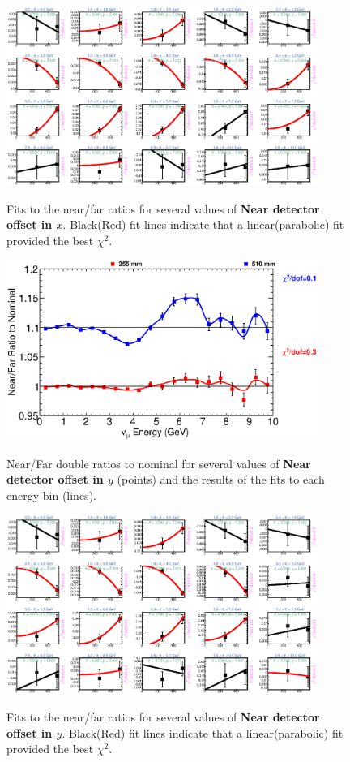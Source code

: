 \begin{figure}[hb]
  \begin{center}
    {\includegraphics[width=4.0in]{figures/LBNENDX_nof_fits.eps}}
  \end{center}
\caption{ Fits to the near/far ratios for several values of {\bf Near detector offset in $x$}. Black(Red) fit lines indicate that a linear(parabolic) fit provided the best $\chi^2$. }
\end{figure}

\begin{figure}[ht]
  \begin{center}
    {\includegraphics[width=4.0in]{figures/LBNENDY_nof_summary.eps}}
  \end{center}
\caption{ Near/Far double ratios to nominal for several values of {\bf Near detector offset in $y$} (points) and the results of the fits to each energy bin (lines).}
\end{figure}

\begin{figure}[hb]
  \begin{center}
    {\includegraphics[width=4.0in]{figures/LBNENDY_nof_fits.eps}}
  \end{center}
\caption{ Fits to the near/far ratios for several values of {\bf Near detector offset in $y$}. Black(Red) fit lines indicate that a linear(parabolic) fit provided the best $\chi^2$. }
\end{figure}


